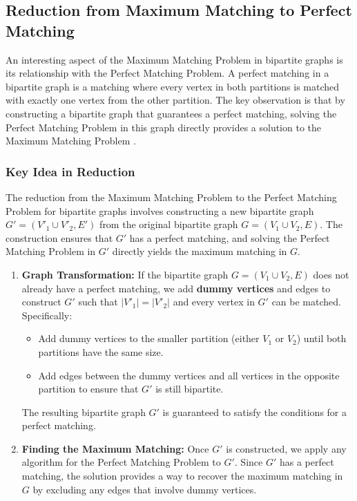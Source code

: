 \subsection{Reduction from Maximum Matching to Perfect Matching}

An interesting aspect of the Maximum Matching Problem in bipartite graphs is its relationship with the Perfect Matching Problem. A perfect matching in a bipartite graph is a matching where every vertex in both partitions is matched with exactly one vertex from the other partition. The key observation is that by constructing a bipartite graph that guarantees a perfect matching, solving the Perfect Matching Problem in this graph directly provides a solution to the Maximum Matching Problem \cite{cormen2009introduction}.

\subsubsection{Key Idea in Reduction}

The reduction from the Maximum Matching Problem to the Perfect Matching Problem for bipartite graphs involves constructing a new bipartite graph $G' = (V'_1 \cup V'_2, E')$ from the original bipartite graph $G = (V_1 \cup V_2, E)$. The construction ensures that $G'$ has a perfect matching, and solving the Perfect Matching Problem in $G'$ directly yields the maximum matching in $G$.

\begin{enumerate}
    \item \textbf{Graph Transformation:} 
    If the bipartite graph $G = (V_1 \cup V_2, E)$ does not already have a perfect matching, we add \textbf{dummy vertices} and edges to construct $G'$ such that $|V'_1| = |V'_2|$ and every vertex in $G'$ can be matched. Specifically:
    \begin{itemize}
        \item Add dummy vertices to the smaller partition (either $V_1$ or $V_2$) until both partitions have the same size.
        \item Add edges between the dummy vertices and all vertices in the opposite partition to ensure that $G'$ is still bipartite.
    \end{itemize}
    The resulting bipartite graph $G'$ is guaranteed to satisfy the conditions for a perfect matching. 
    \item \textbf{Finding the Maximum Matching:} Once $G'$ is constructed, we apply any algorithm for the Perfect Matching Problem to $G'$. Since $G'$ has a perfect matching, the solution provides a way to recover the maximum matching in $G$ by excluding any edges that involve dummy vertices.
\end{enumerate}

